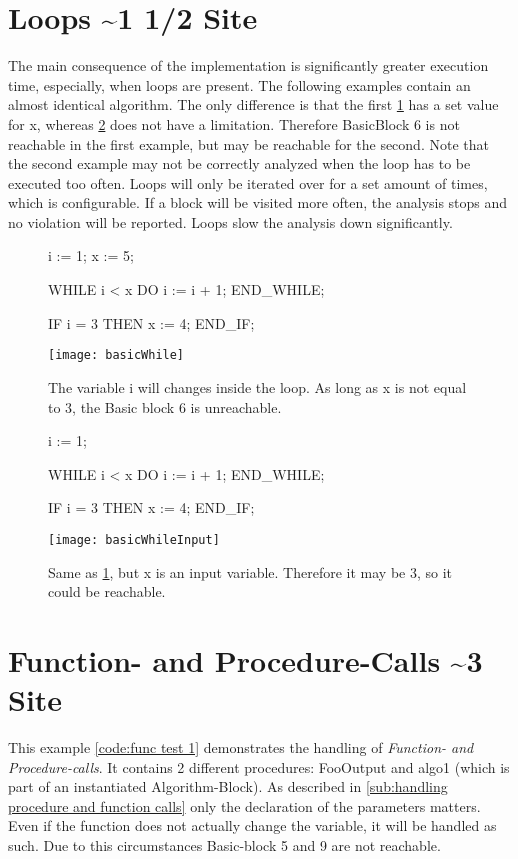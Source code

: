 \section{Loops \textasciitilde 1 1/2 Site}
The main consequence of the implementation is significantly greater execution time, especially, when loops are present.
The following examples contain an almost identical algorithm. The only difference is that the first \ref{code:loop example 1} has a set value for x, whereas \ref{code:loop example 2} does not have a limitation. Therefore BasicBlock 6 is not reachable in the first example, but may be reachable for the second.
Note that the second example may not be correctly analyzed when the loop has to be executed too often. Loops will only be iterated over for a set amount of times, which is configurable. If a block will be visited more often, the analysis stops and no violation will be reported.
Loops slow the analysis down significantly. 
\begin{figure}[h!]
	\begin{GenericCode}
		i := 1;
		x := 5;
		
		WHILE i < x DO
			i := i + 1;
		END_WHILE;
		
		IF i = 3 THEN
			x := 4;
		END_IF;	
	\end{GenericCode}
	\centering
	\texttt{[image: basicWhile]}
	\caption{The variable i will changes inside the loop. As long as x is not equal to 3, the Basic block 6 is unreachable. }
	\label{code:loop example 1}
\end{figure}
\begin{figure}[h!]
	\begin{GenericCode}
		i := 1;
		
		WHILE i < x DO
			i := i + 1;
		END_WHILE;
		
		IF i = 3 THEN
			x := 4;
		END_IF;	
	\end{GenericCode}
	\centering
	\texttt{[image: basicWhileInput]}
	\caption{Same as \ref{code:loop example 1}, but x is an input variable. Therefore it may be 3, so it could be reachable.}
	\label{code:loop example 2}
\end{figure}
\section{Function- and Procedure-Calls \textasciitilde 3 Site}
This example \ref{code:func test 1} demonstrates the handling of \emph{Function- and Procedure-calls}. It contains 2 different procedures: FooOutput and algo1 (which is part of an instantiated Algorithm-Block). 
As described in \ref{sub:handling procedure and function calls} only the declaration of the parameters matters. Even if the function does not actually change the variable, it will be handled as such. 
Due to this circumstances Basic-block 5 and 9 are not reachable.

